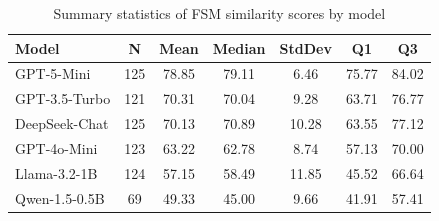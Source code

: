 \documentclass[12pt]{article}
\begin{document}
\begin{table}[htbp]
\centering
\caption{Summary statistics of FSM similarity scores by model}
\label{tab:fsm-summary-stats}
\begin{tabular}{lcccccc}
\hline
\textbf{Model} & \textbf{N} & \textbf{Mean} & \textbf{Median} & \textbf{StdDev} & \textbf{Q1} & \textbf{Q3} \\
\hline
GPT-5-Mini          & 125 & 78.85 & 79.11 & 6.46  & 75.77 & 84.02 \\
GPT-3.5-Turbo       & 121 & 70.31 & 70.04 & 9.28  & 63.71 & 76.77 \\
DeepSeek-Chat       & 125 & 70.13 & 70.89 & 10.28 & 63.55 & 77.12 \\
GPT-4o-Mini         & 123 & 63.22 & 62.78 & 8.74  & 57.13 & 70.00 \\
Llama-3.2-1B        & 124 & 57.15 & 58.49 & 11.85 & 45.52 & 66.64 \\
Qwen-1.5-0.5B       & 69  & 49.33 & 45.00 & 9.66  & 41.91 & 57.41 \\
\hline
\end{tabular}
\end{table}
\end{document}
